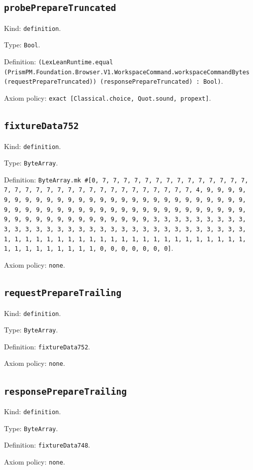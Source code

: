 \documentclass[11pt]{article}
\begin{document}
\subsection*{\texttt{probePrepareTruncated}}
\noindent Kind: \texttt{definition}.\par
\noindent Type: \texttt{Bool}.\par
\noindent Definition: \texttt{(LexLeanRuntime.equal (PrismPM.Foundation.Browser.V1.WorkspaceCommand.workspaceCommandBytes (requestPrepareTruncated)) (responsePrepareTruncated) : Bool)}.\par
\noindent Axiom policy: \texttt{exact [Classical.choice, Quot.sound, propext]}.\par
\subsection*{\texttt{fixtureData752}}
\noindent Kind: \texttt{definition}.\par
\noindent Type: \texttt{ByteArray}.\par
\noindent Definition: \texttt{ByteArray.mk \#[0, 7, 7, 7, 7, 7, 7, 7, 7, 7, 7, 7, 7, 7, 7, 7, 7, 7, 7, 7, 7, 7, 7, 7, 7, 7, 7, 7, 7, 7, 7, 7, 7, 4, 9, 9, 9, 9, 9, 9, 9, 9, 9, 9, 9, 9, 9, 9, 9, 9, 9, 9, 9, 9, 9, 9, 9, 9, 9, 9, 9, 9, 9, 9, 9, 9, 9, 9, 9, 9, 9, 9, 9, 9, 9, 9, 9, 9, 9, 9, 9, 9, 9, 9, 9, 9, 9, 9, 9, 9, 9, 9, 9, 9, 9, 9, 9, 9, 3, 3, 3, 3, 3, 3, 3, 3, 3, 3, 3, 3, 3, 3, 3, 3, 3, 3, 3, 3, 3, 3, 3, 3, 3, 3, 3, 3, 3, 3, 3, 3, 1, 1, 1, 1, 1, 1, 1, 1, 1, 1, 1, 1, 1, 1, 1, 1, 1, 1, 1, 1, 1, 1, 1, 1, 1, 1, 1, 1, 1, 1, 1, 1, 0, 0, 0, 0, 0, 0, 0]}.\par
\noindent Axiom policy: \texttt{none}.\par
\subsection*{\texttt{requestPrepareTrailing}}
\noindent Kind: \texttt{definition}.\par
\noindent Type: \texttt{ByteArray}.\par
\noindent Definition: \texttt{fixtureData752}.\par
\noindent Axiom policy: \texttt{none}.\par
\subsection*{\texttt{responsePrepareTrailing}}
\noindent Kind: \texttt{definition}.\par
\noindent Type: \texttt{ByteArray}.\par
\noindent Definition: \texttt{fixtureData748}.\par
\noindent Axiom policy: \texttt{none}.\par
\end{document}
